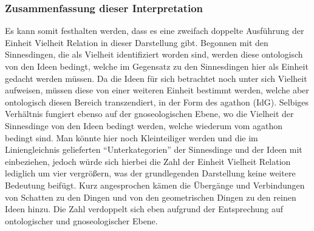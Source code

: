 \subsubsection*{Zusammenfassung dieser Interpretation}
Es kann somit festhalten werden, dass es eine zweifach doppelte Ausführung der Einheit Vielheit Relation in dieser Darstellung gibt.
Begonnen mit den Sinnesdingen, die als Vielheit identifiziert worden sind, werden diese ontologisch von den Ideen bedingt, welche im Gegensatz zu den Sinnesdingen hier als Einheit gedacht werden müssen. Da die Ideen für sich betrachtet noch unter sich Vielheit aufweisen, müssen diese von einer weiteren Einheit bestimmt werden, welche aber ontologisch diesen Bereich transzendiert, in der Form des agathon (IdG). Selbiges Verhältnis fungiert ebenso auf der gnoseologischen Ebene, wo die Vielheit der Sinnesdinge von den Ideen bedingt werden, welche wiederum vom agathon bedingt sind. Man könnte hier noch Kleinteiliger werden und die im Liniengleichnis gelieferten \enquote{Unterkategorien} der Sinnesdinge und der Ideen mit einbeziehen, jedoch würde sich hierbei die Zahl der Einheit Vielheit Relation lediglich um vier vergrößern, was der grundlegenden Darstellung keine weitere Bedeutung beifügt. Kurz angesprochen kämen die Übergänge und Verbindungen von Schatten zu den Dingen und von den geometrischen Dingen zu den reinen Ideen hinzu. Die Zahl verdoppelt sich eben aufgrund der Entsprechung auf ontologischer und gnoseologischer Ebene.\\

